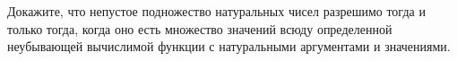 Докажите, что непустое подножество натуральных чисел разрешимо тогда и только тогда, когда оно есть
множество значений всюду определенной неубывающей вычислимой функции с натуральными аргументами и
значениями.
